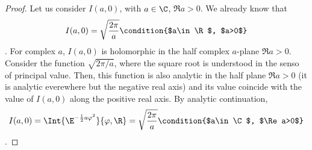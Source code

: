 \begin{proof}
   Let  us consider $I(a,0)$, with $a\in\C$, $\Re a >0$.
We already know that 
\begin{dmath*}
   I(a,0) = \sqrt{\frac{2\pi}{a}}  \condition{$a\in\R$, $a>0$}
\end{dmath*}.
For complex $a$, $I(a,0)$ is holomorphic in the half complex $a$-plane 
$\Re a>0$.
Consider the function $\sqrt{2\pi/a}$, where the square root is
understood in the senso of principal value. Then, this function is also
analytic in the half plane $\Re a>0$ (it is analytic everewhere but the
negative real axis) and its value coincide with the value of
$I(a,0)$ along the positive real axis.
By analytic continuation, 
\begin{dmath}[compact]%
   I(a,0) = \Int{\E^{-\frac{1}{2} a\varphi^{2}}}{\varphi,\R} =
   \sqrt{\frac{2\pi}{a}} \condition{$a\in\C$, $\Re a>0$}
\end{dmath}.


\end{proof}
